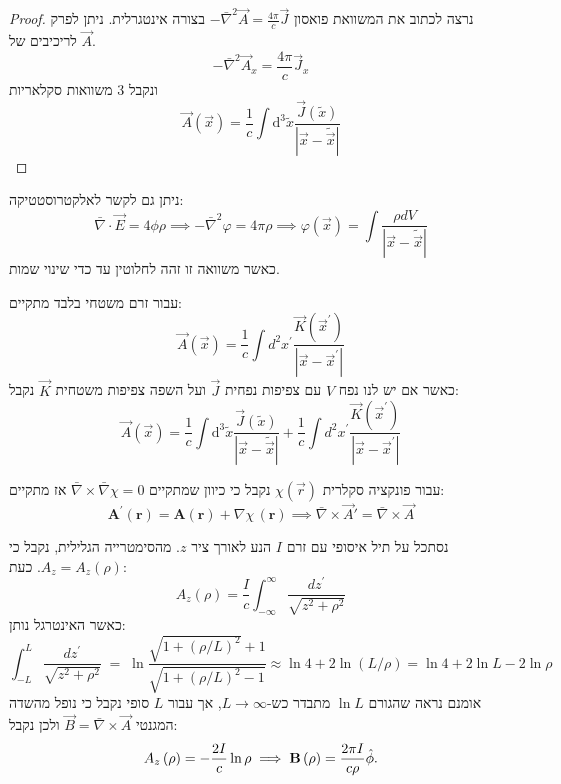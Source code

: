 \documentclass{tstextbook}
\begin{document}
\begin{proof}
נרצה לכתוב את המשוואת פואסון \(-\bar{\nabla}^2 \vec{A}=\frac{4\pi}{c}\vec{J}\) בצורה אינטגרלית. ניתן לפרק לריכיבים של \(\vec{A}\).
$$-\bar{\nabla}^2 \vec{A}_{x}=\frac{4\pi}{c}\vec{J}_{x}$$
ונקבל 3 משוואות סקלאריות
$$\vec{A}\left( \vec{x} \right)=\frac{1}{c}\int\mathrm{d}^3\tilde{x}  \frac{\vec{J}\left( \tilde{x} \right)}{\left\lvert  \vec{x}-\tilde{\vec{x}}  \right\rvert }$$

\end{proof}
\begin{remark}
ניתן גם לקשר לאלקטרוסטטיקה:
$$\bar{\nabla} \cdot \vec{E}=4\phi \rho \implies - \bar{\nabla}^2  \varphi = 4\pi \rho\implies \varphi\left( \vec{x} \right)=\int \frac{\rho dV}{\left\lvert  \vec{x}-\tilde{\vec{x}}  \right\rvert }$$
כאשר משוואה זו זהה לחלוטין עד כדי שינוי שמות.

\end{remark}
\begin{proposition}
עבור זרם משטחי בלבד מתקיים:
$$\vec{A}\left( \vec{x} \right)=\frac{1}{c}\int d^{2}x^{\prime}\frac{\vec{K}\left( \vec{x}^{\prime} \right)}{|\vec{x}-\vec{x}^{\prime}|}$$
כאשר אם יש לנו נפח \(V\) עם צפיפות נפחית \(\vec{J}\) ועל השפה צפיפות משטחית \(\vec{K}\) נקבל:
$$\vec{A}\left( \vec{x} \right)=\frac{1}{c}\int\mathrm{d}^3\tilde{x}  \frac{\vec{J}\left( \tilde{x} \right)}{\left\lvert  \vec{x}-\tilde{\vec{x}}  \right\rvert }+\frac{1}{c}\int d^{2}x^{\prime}\frac{\vec{K}\left( \vec{x}^{\prime} \right)}{|\vec{x}-\vec{x}^{\prime}|}$$

\end{proposition}
\begin{proposition}
עבור פונקציה סקלרית \(\chi\left( \vec{r} \right)\) נקבל כי כיוון שמתקיים \(\bar{\nabla} \times \bar{\nabla}\chi=0\) אז מתקיים:
$$\mathbf{A}^{\prime}\left( \mathbf{r} \right)=\mathbf{A}\left( \mathbf{r} \right)+\nabla\chi\,\left( \mathbf{r} \right)\implies \bar{\nabla} \times  \vec{A}'=\bar{\nabla} \times \vec{A}$$

\end{proposition}
\begin{example}
נסתכל על תיל איסופי עם זרם \(I\) הנע לאורך ציר \(z\). מהסימטרייה הגלילית, נקבל כי \(A_{z}=A_{z}\left( \rho \right)\). כעת:
$$A_{z}(\rho)=\frac{I}{c}\int_{-\infty}^{\infty}\frac{d z^{\prime}}{\sqrt{z^{2}+\rho^{2}}}$$
כאשר האינטרגל נותן:
$$\int_{-L}^{L}\frac{d z^{\prime}}{\sqrt{z^{2}+\rho^{2}}}\;=\;\ln\frac{\sqrt{1+\left( \rho/L \right)^{2}}+1}{\sqrt{1+\left( \rho/L \right)^{2}-1}}\approx\ln4+2\ln\left( L/\rho \right)=\ln 4 +2\ln L - 2\ln \rho$$
אומנם נראה שהגורם \(\ln L\) מתבדר כש-\(L\to \infty\), אך עבור \(L\) סופי נקבל כי נופל מהשדה המגנטי \(\vec{B}=\bar{\nabla} \times \vec{A}\) ולכן נקבל:
$$A_{z}\left( \rho \right)=-\frac{2I}{c}\ln\rho \implies {\bf B}\left( \rho \right)=\frac{2\pi I}{c\rho}\hat{\phi}.$$

\end{example}
\end{document}
